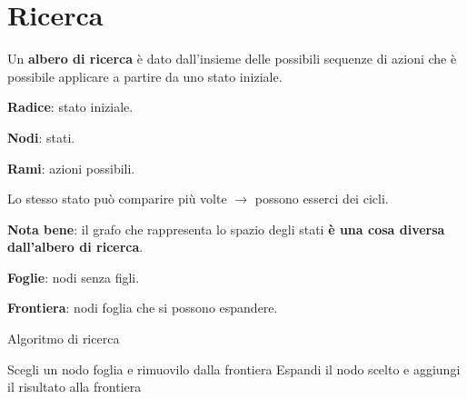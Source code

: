 \newpage

\section{Ricerca}

Un \textbf{albero di ricerca} è dato dall'insieme delle possibili sequenze di
azioni che è possibile applicare a partire da uno stato iniziale.

\textbf{Radice}: stato iniziale.

\textbf{Nodi}: stati.

\textbf{Rami}: azioni possibili.

Lo stesso stato può comparire più volte $\rightarrow$ possono esserci dei cicli.

\textbf{Nota bene}: il grafo che rappresenta lo spazio degli stati \textbf{è una
cosa diversa dall'albero di ricerca}.

\textbf{Foglie}: nodi senza figli.

\textbf{Frontiera}: nodi foglia che si possono espandere.

\begin{algorithm}
    \caption{Algoritmo di ricerca}
    \label{search}
    \begin{algorithmic}[1] %
         
            \Loop
              \EndIf
            \State Scegli un nodo foglia e rimuovilo dalla frontiera
              \EndIf
            \State Espandi il nodo scelto e aggiungi il risultato alla frontiera
			\EndLoop
        \EndProcedure
    \end{algorithmic}
\end{algorithm}






